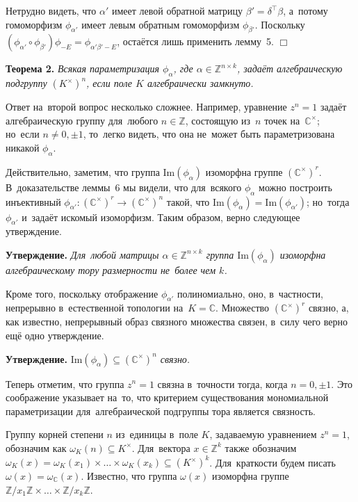 \documentclass[twoside]{article}
\begin{document}
    Нетрудно видеть, что $\alpha'$ имеет левой обратной матрицу $\beta' = \delta^{\top} \beta$,
    а~потому гомоморфизм $\phi_{\alpha'}$ имеет левым обратным гомоморфизм $\phi_{\beta'}$.
    Поскольку $(\phi_{\alpha'} \circ \phi_{\beta'}) \phi_{-E} = \phi_{\alpha' \beta' - E}$, остаётся лишь применить лемму~5.
\hfill$\Box$\medskip

\medskip\noindent\textbf{Теорема 2.}\emph{
    Всякая параметризация $\phi_\alpha$, где $\alpha \in \mathbb{Z}^{n \times k}$, задаёт алгебраическую подгруппу $(K^\times)^n$,
    если поле $K$ алгебраически замкнуто.
}\medskip

Ответ на~второй вопрос несколько сложнее. Например, уравнение $z^n = 1$ задаёт алгебраическую
группу для~любого $n \in \mathbb{Z}$, состоящую из~$n$ точек на~$\mathbb{C}^\times$; но~если $n \neq 0, \pm 1$,
то~легко видеть, что она не~может быть параметризована никакой $\phi_\alpha$.

Действительно, заметим, что группа $\mathrm{Im}(\phi_\alpha)$ изоморфна группе $(\mathbb{C}^\times)^r$. В~доказательстве леммы~6 мы видели, что для~всякого $\phi_\alpha$
можно построить инъективный $\phi_{\alpha'} : (\mathbb{C}^\times)^r \rightarrow (\mathbb{C}^\times)^n$ такой, что $\mathrm{Im}(\phi_\alpha) = \mathrm{Im}(\phi_{\alpha'})$;
но~тогда $\phi_{\alpha'}$ и~задаёт искомый изоморфизм. Таким образом, верно следующее утверждение.

\medskip\noindent\textbf{Утверждение.}\emph{
    Для~любой матрицы $\alpha \in \mathbb{Z}^{n \times k}$ группа $\mathrm{Im}(\phi_\alpha)$ изоморфна алгебраическому тору размерности не~более чем $k$.
}\medskip

Кроме того, поскольку отображение $\phi_{\alpha'}$ полиномиально, оно, в~частности, непрерывно в~естественной топологии на~$K = \mathbb{C}$.
Множество $(\mathbb{C}^\times)^r$ связно, а, как известно, непрерывный образ связного множества связен, в~силу чего верно ещё одно утверждение.

\medskip\noindent\textbf{Утверждение.}\emph{
    $\mathrm{Im}(\phi_\alpha) \subseteq (\mathbb{C}^\times)^n$ связно.
}\medskip

Теперь отметим, что группа $z^n = 1$ связна в~точности тогда, когда $n = 0, \pm 1$.
Это соображение указывает на~то, что критерием существования мономиальной параметризации
для~алгебраической подгруппы тора является связность.

Группу корней степени $n$ из~единицы в~поле $K$, задаваемую уравнением $z^n = 1$, обозначим как $\omega_K(n) \subseteq K^\times$.
Для~вектора $x \in \mathbb{Z}^k$ также обозначим $\omega_K(x) = \omega_K(x_1) \times \ldots \times \omega_K(x_k) \subseteq (K^\times)^k$.
Для~краткости будем писать $\omega(x) = \omega_\mathbb{C}(x)$. Известно, что группа $\omega(x)$ изоморфна
группе $\mathbb{Z} / x_1 \mathbb{Z} \times \ldots \times \mathbb{Z} / x_k \mathbb{Z}$.
\end{document}
